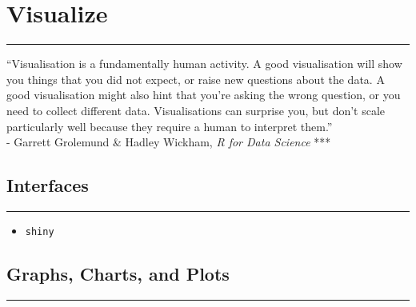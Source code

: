 \documentclass[
]{book}
\providecommand{\tightlist}{%
  \setlength{\itemsep}{0pt}\setlength{\parskip}{0pt}}
\begin{document}
\hypertarget{visualize}{%
\chapter{Visualize}\label{visualize}}

\begin{center}\rule{0.5\linewidth}{0.5pt}\end{center}

``Visualisation is a fundamentally human activity. A good visualisation will show you things that you did not expect, or raise new questions about the data. A good visualisation might also hint that you're asking the wrong question, or you need to collect different data. Visualisations can surprise you, but don't scale particularly well because they require a human to interpret them.''\\
- Garrett Grolemund \& Hadley Wickham, \emph{R for Data Science}
***

\hypertarget{interfaces}{%
\section{Interfaces}\label{interfaces}}

\begin{center}\rule{0.5\linewidth}{0.5pt}\end{center}

\begin{itemize}
\tightlist
\item
  \texttt{shiny}
\end{itemize}

\hypertarget{graphs-charts-and-plots}{%
\section{Graphs, Charts, and Plots}\label{graphs-charts-and-plots}}

\begin{center}\rule{0.5\linewidth}{0.5pt}\end{center}
\end{document}
